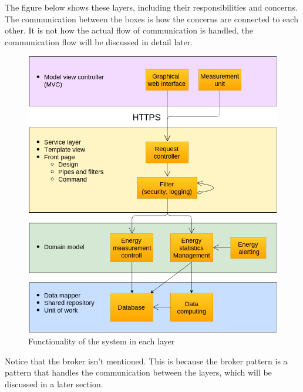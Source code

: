 The figure below shows these layers, including their responsibilities and concerns. The communication between the boxes is how the concerns are connected to each other. It is not how the actual flow of communication is handled, the communication flow will be discussed in detail later. 

\begin{figure}[H]
\centering
\includegraphics[scale=0.7]{7-software/images/layersflow.png}
\caption{Functionality of the system in each layer}
\label{fig:layersflow}
\end{figure}

Notice that the broker isn't mentioned. This is because the broker pattern is a pattern that handles the communication between the layers, which will be discussed in a later section.

